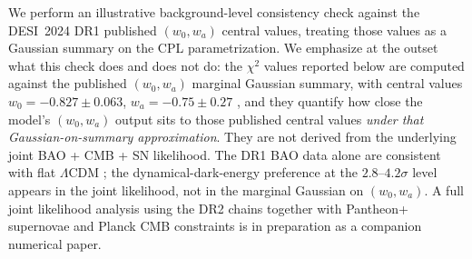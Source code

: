 \documentclass[11pt,reqno]{amsart}
\theoremstyle{plain}
\theoremstyle{definition}
\theoremstyle{remark}
\begin{document}
We perform an illustrative background-level consistency check against
the DESI~2024 DR1 published $(w_0, w_a)$ central values, treating those
values as a Gaussian summary on the CPL parametrization. We emphasize at
the outset what this check does and does not do: the
$\chi^{2}$ values reported below are computed against the published
$(w_0, w_a)$ marginal Gaussian summary, with central values
$w_0 = -0.827 \pm 0.063$, $w_a = -0.75 \pm 0.27$ \cite{DESI2024VI}, and
they quantify how close the model's $(w_0, w_a)$ output sits to those
published central values \emph{under that Gaussian-on-summary
approximation}. They are not derived from the underlying joint
BAO + CMB + SN likelihood. The DR1 BAO data alone are consistent with
flat $\Lambda$CDM \cite{DESI2024BAO}; the dynamical-dark-energy
preference at the $2.8$--$4.2\sigma$ level appears in the joint
likelihood, not in the marginal Gaussian on $(w_0, w_a)$. A full joint
likelihood analysis using the DR2 chains \cite{DESI2025DR2} together
with Pantheon+ supernovae and Planck CMB constraints is in preparation
as a companion numerical paper.
\end{document}
